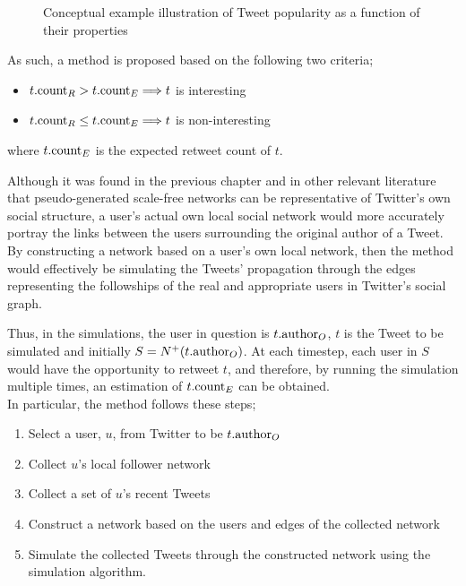 \begin{figure}[h]
\centering
{}
\caption{Conceptual example illustration of Tweet popularity as a function of their properties}
\label{fig:helmholtz}
\end{figure}

As such, a method is proposed based on the following two criteria;
\begin{itemize}
    \item $t.\textrm{count}_R > t.\textrm{count}_E \Longrightarrow t$ is interesting
    \item $t.\textrm{count}_R \leq t.\textrm{count}_E \Longrightarrow t$ is non-interesting
\end{itemize}
where $t.\textrm{count}_E$ is the expected retweet count of $t$.

Although it was found in the previous chapter and in other relevant literature that pseudo-generated scale-free networks can be representative of Twitter's own social structure, a user's actual own local social network would more accurately portray the links between the users surrounding the original author of a Tweet. By constructing a network based on a user's own local network, then the method would effectively be simulating the Tweets' propagation through the edges representing the followships of the real and appropriate users in Twitter's social graph.

Thus, in the simulations, the user in question is $t.\textrm{author}_O$, $t$ is the Tweet to be simulated and initially $S = N^+(t.\textrm{author}_O)$. At each timestep, each user in $S$ would have the opportunity to retweet $t$, and therefore, by running the simulation multiple times, an estimation of $t.\textrm{count}_E$ can be obtained.\\
In particular, the method follows these steps;
\begin{enumerate}
    \item Select a user, $u$, from Twitter to be $t.\textrm{author}_O$
    \item Collect $u$'s local follower network 
    \item Collect a set of $u$'s recent Tweets
    \item Construct a network based on the users and edges of the collected network
    \item Simulate the collected Tweets through the constructed network using the simulation algorithm.
\end{enumerate}

